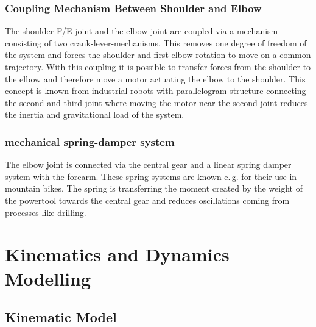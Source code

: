 \documentclass[letterpaper, 10 pt, conference]{ieeeconf}  %
\begin{document}
\subsubsection{Coupling Mechanism Between Shoulder and Elbow}

The shoulder F/E joint and the elbow joint are coupled via a mechanism consisting of two crank-lever-mechanisms.
This removes one degree of freedom of the system and forces the shoulder and first elbow rotation to move on a common trajectory.
With this coupling it is possible to transfer forces from the shoulder to the elbow and therefore move a motor actuating the elbow to the shoulder.
This concept is known from industrial robots with parallelogram structure connecting the second and third joint where moving the motor near the second joint reduces the inertia and gravitational load of the system.

\subsubsection{mechanical spring-damper system}

The elbow joint is connected via the central gear and a linear spring damper system with the forearm.
These spring systems are known e.\,g. for their use in mountain bikes.
The spring is transferring the moment created by the weight of the powertool towards the central gear and reduces oscillations coming from processes like drilling.

\section{Kinematics and Dynamics Modelling}

\subsection{Kinematic Model}
\end{document}
